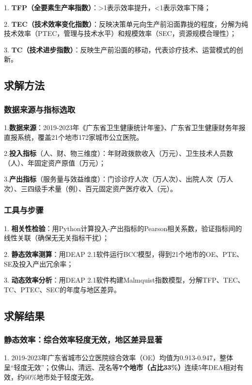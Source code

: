 \documentclass{MathNoteCN}
\begin{document}
1. \textbf{TFP（全要素生产率指数）}：>1表示效率提升，<1表示效率下降；

2. \textbf{TEC（技术效率变化指数）}：反映决策单元向生产前沿面靠拢的程度，分解为纯技术效率（PTEC，管理与技术水平）和规模效率（SEC，资源规模合理性）；

3. \textbf{TC（技术进步指数）}：反映生产前沿面的移动，代表诊疗技术、运营模式的创新\cite{chen2025}。


\subsection{求解方法}
\subsubsection{数据来源与指标选取}
1.\textbf{数据来源}：2019-2023年《广东省卫生健康统计年鉴》、广东省卫生健康财务年报直报系统，覆盖21个地市172家城市公立医院\cite{chen2025}。

2.\textbf{投入指标}（人、财、物三维度）：年财政拨款收入（万元）、卫生技术人员数（人）、年固定资产原值（万元）；  

3.\textbf{产出指标}（服务量与效益维度）：门诊诊疗人次（万人次）、出院人次（万人次）、三四级手术量（例）、百元固定资产医疗收入（元）\cite{chen2025}。

\subsubsection{工具与步骤}
1. \textbf{相关性检验}：用Python计算投入-产出指标的Pearson相关系数，验证指标间的线性关联（确保无无关指标干扰）；

2. \textbf{静态效率测算}：用DEAP 2.1软件运行BCC模型，得到21个地市的OE、PTE、SE及投入产出冗余率；

3. \textbf{动态效率分析}：用DEAP 2.1软件构建Malmquist指数模型，分解TFP、TEC、TC、PTEC、SEC的年度与地区差异\cite{chen2025}。


\subsection{求解结果}
\subsubsection{静态效率：综合效率轻度无效，地区差异显著}
1. 2019-2023年广东省城市公立医院综合效率（OE）均值为0.913-0.947，整体呈“轻度无效”；仅佛山、清远、茂名等\textbf{7个地市（占比33\%）}连续5年DEA相对有效，约60\%地市处于轻度无效\cite{chen2025}。
\end{document}
